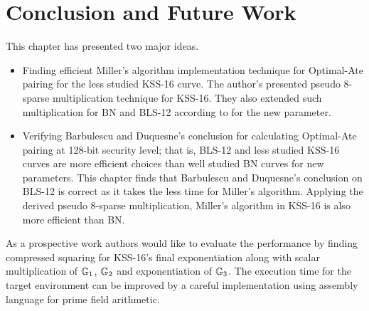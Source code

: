 \section{Conclusion and Future Work}
This chapter has presented two major ideas.
\begin{itemize}
\item Finding efficient Miller's algorithm implementation technique for Optimal-Ate pairing for the less studied KSS-16 curve. The author's presented pseudo 8-sparse multiplication technique for KSS-16. They also extended such multiplication for BN and BLS-12 according to \cite{PAIRING:MANS13} for the new parameter. 
\item Verifying Barbulescu and Duquesne's conclusion \cite{EPRINT:BarDuq17} for calculating Optimal-Ate pairing at 128-bit security level; that is, BLS-12 and less studied KSS-16 curves are more efficient choices than well studied BN curves for new parameters. 
This chapter finds that Barbulescu and Duquesne's conclusion on BLS-12 is correct as it takes the less time for Miller's algorithm.
Applying the derived pseudo 8-sparse multiplication, Miller's algorithm in KSS-16 is also more efficient than BN.
\end{itemize}
As a prospective work authors would like to evaluate the performance by finding compressed squaring for KSS-16's final exponentiation along with scalar multiplication of ${\mathbb{G}}_{1}$, ${\mathbb{G}}_{2}$ and exponentiation of ${\mathbb{G}}_{3}$. The execution time for the target environment can be improved by a careful implementation using assembly language for prime field arithmetic.  
